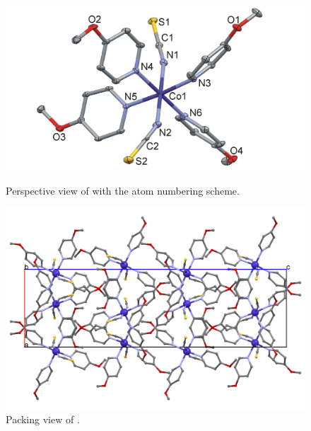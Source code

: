 \begin{figure}[!htpb]
\centering
\includegraphics[width=1\textwidth]{figures/cormop_FIGm11.png}
\caption[Perspective view of ]{Perspective view of  with the atom numbering scheme.}
\label{fig:CoR4MOP_pv}
\vspace{\floatsep}
\includegraphics[width=1\textwidth]{figures/cormop_CB.png}
\caption{Packing view  of .}
\label{fig:CoR4MOP_packv}
\end{figure}


